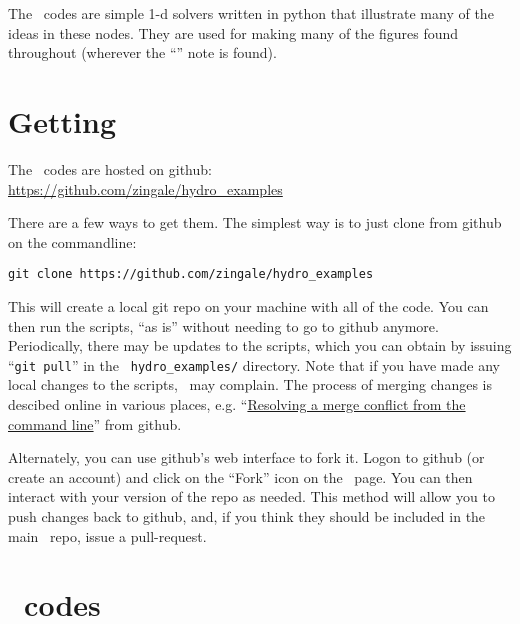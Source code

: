 \label{app:hydroex}

\begin{quote}
\end{quote}

The \hydroex\ codes are simple 1-d solvers written in python that illustrate many of the
ideas in these nodes.  They are used for making many of the figures found throughout
(wherever the ``\hydroexdoit{}'' note is found).

\section{Getting \hydroex}

The \hydroex\ codes are hosted on github:\\
\url{https://github.com/zingale/hydro_examples}

There are a few ways to get them.  The simplest way is to just clone
from github on the commandline:

\begin{verbatim}
git clone https://github.com/zingale/hydro_examples
\end{verbatim}

This will create a local git repo on your machine with all of the
code.  You can then run the scripts, ``as is'' without needing to go
to github anymore.  Periodically, there may be updates to the scripts,
which you can obtain by issuing ``{\tt git pull}'' in the {\tt
  hydro\_examples/} directory.  Note that if you have made any local
changes to the scripts, \git\ may complain.  The process of merging
changes is descibed online in various places,
e.g. ``\href{https://help.github.com/articles/resolving-a-merge-conflict-from-the-command-line}{Resolving
  a merge conflict from the command line}'' from github.

Alternately, you can use github's web interface to fork it.  Logon to
github (or create an account) and click on the ``Fork'' icon on the
\hydroex\ page.  You can then interact with your version of the repo
as needed.  This method will allow you to push changes back to github,
and, if you think they should be included in the main \hydroex\ repo,
issue a pull-request.

\section{\hydroex\ codes}

